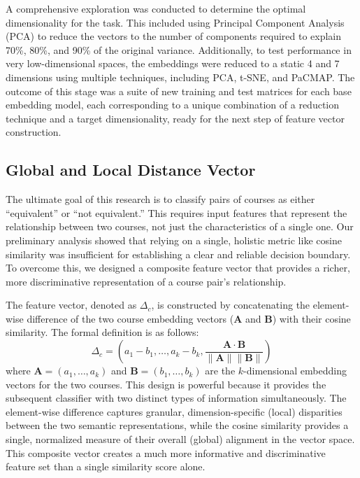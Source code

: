 A comprehensive exploration was conducted to determine the optimal dimensionality for the task. This included using Principal Component Analysis (PCA) to reduce the vectors to the number of components required to explain 70\%, 80\%, and 90\% of the original variance. Additionally, to test performance in very low-dimensional spaces, the embeddings were reduced to a static 4 and 7 dimensions using multiple techniques, including PCA, t-SNE, and PaCMAP.  The outcome of this stage was a suite of new training and test matrices for each base embedding model, each corresponding to a unique combination of a reduction technique and a target dimensionality, ready for the next step of feature vector construction.

\subsection{Global and Local Distance Vector}
The ultimate goal of this research is to classify pairs of courses as either “equivalent” or “not equivalent.” This requires input features that represent the relationship between two courses, not just the characteristics of a single one. Our preliminary analysis showed that relying on a single, holistic metric like cosine similarity was insufficient for establishing a clear and reliable decision boundary. To overcome this, we designed a composite feature vector that provides a richer, more discriminative representation of a course pair's relationship.

The feature vector, denoted as \(\Delta_c\), is constructed by concatenating the element-wise difference of the two course embedding vectors (\(\mathbf{A}\) and \(\mathbf{B}\)) with their cosine similarity. The formal definition is as follows:
\[ \Delta_c = \left(a_1 - b_1, \dots, a_k - b_k, \frac{\mathbf{A}\cdot\mathbf{B}}{\parallel \mathbf{A} \parallel \parallel \mathbf{B} \parallel } \right) \]
where \(\mathbf{A} = (a_1, \dots, a_k) \) and \(\mathbf{B} = (b_1, \dots, b_k) \) are the \(k\)-dimensional embedding vectors for the two courses.  This design is powerful because it provides the subsequent classifier with two distinct types of information simultaneously. The element-wise difference captures granular, dimension-specific (local) disparities between the two semantic representations, while the cosine similarity provides a single, normalized measure of their overall (global) alignment in the vector space. This composite vector creates a much more informative and discriminative feature set than a single similarity score alone.

